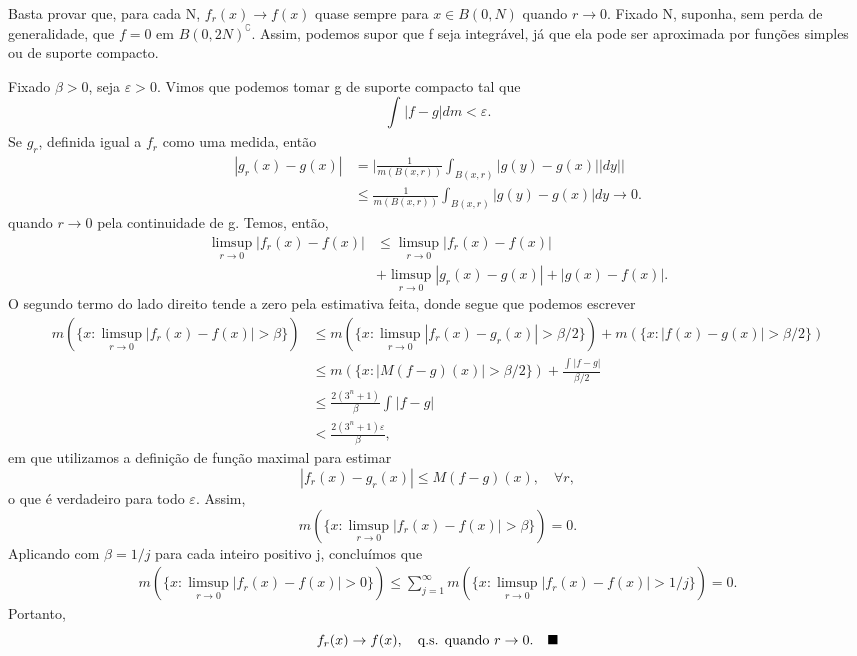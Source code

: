 \documentclass[measure_theory.tex]{subfiles}
\begin{document}
\begin{proof*}
	Basta provar que, para cada N, \(f_{r}(x)\to f(x)\) quase sempre para \(x\in B(0, N)\) quando \(r\to 0.\) Fixado N, suponha, sem perda de generalidade, que \(f = 0\) em \(B(0, 2N)^{\complement}\).
	Assim, podemos supor que f seja integrável, já que ela pode ser aproximada por funções simples ou de suporte compacto.

	Fixado \(\beta > 0\), seja \(\varepsilon > 0\). Vimos que podemos tomar g de suporte compacto tal que
	\[
		\int_{}|f-g| dm < \varepsilon .
	\]
	Se \(g_r\), definida igual a \(f_r\) como uma medida, então
	\begin{align*}
		|g_r(x) - g(x)| & = \biggl\vert \frac{1}{m(B(x, r))} \int_{B(x, r)}^{}|g(y) - g(x)||dy|\biggr\vert \\
		                & \leq \frac{1}{m(B(x, r))}\int_{B(x, r)}^{}|g(y)-g(x)|dy\to 0.
	\end{align*}
	quando \(r\to 0\) pela continuidade de g. Temos, então,
	\begin{align*}
		\limsup_{r\to 0}|f_r(x) - f(x)| & \leq \limsup_{r\to 0}|f_r(x) - f(x)|               \\
		                                & + \limsup_{r\to 0}|g_r(x) - g(x)| + |g(x) - f(x)|.
	\end{align*}
	O segundo termo do lado direito tende a zero pela estimativa feita, donde segue que podemos escrever
	\begin{align*}
		m(\{x:\limsup_{r\to 0}|f_r(x) - f(x)| > \beta \}) & \leq m(\{x:\limsup_{r\to 0}|f_r(x) - g_r(x)|>\beta /2\}) + m(\{x: |f(x)-g(x)| > \beta/2\}) \\
		                                                  & \leq m(\{x: |M(f-g)(x)|>\beta /2\}) + \frac{\int_{}^{}|f-g|}{\beta/2}                      \\
		                                                  & \leq \frac{2(3^{n}+1)}{\beta }\int_{}^{}|f-g|                                              \\
		                                                  & < \frac{2(3^{n}+1)\varepsilon }{\beta },
	\end{align*}
	em que utilizamos a definição de função maximal para estimar
	\[
		|f_r(x) - g_r(x)| \leq M(f-g)(x),\quad \forall r,
	\]
	o que é verdadeiro para todo \(\varepsilon \). Assim,
	\[
		m(\{x:\limsup_{r\to 0}|f_r(x) - f(x)| > \beta \}) = 0.
	\]
	Aplicando com \(\beta  = 1/j\) para cada inteiro positivo j, concluímos que
	\begin{align*}
		m(\{x:\limsup_{r\to 0}|f_r(x)-f(x)| > 0\}) \leq \sum\limits_{j=1}^{\infty}m(\{x:\limsup_{r\to 0}|f_r(x) - f(x)| > 1/j\}) = 0.
	\end{align*}
	Portanto,
	\[
		f_r(x)\to f(x),\quad \text{q.s. quando }r\to 0.\quad \text{$\blacksquare$}
	\]
\end{proof*}
\end{document}

